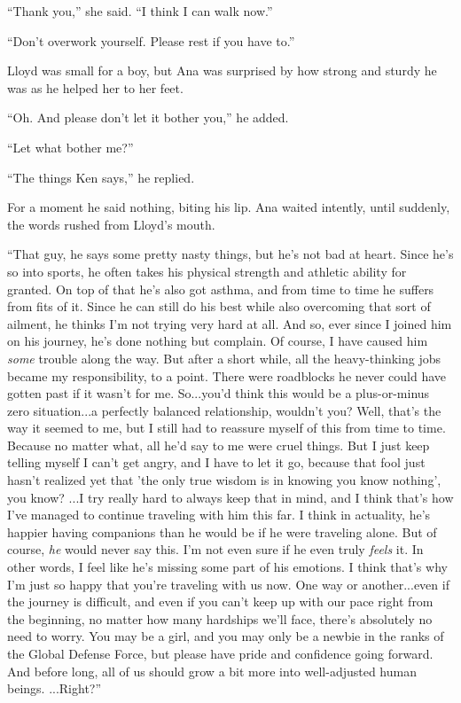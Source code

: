 \documentclass[
]{article}
\begin{document}
``Thank you,'' she said. ``I think I can walk now.''

``Don't overwork yourself. Please rest if you have to.''

Lloyd was small for a boy, but Ana was surprised by how strong and
sturdy he was as he helped her to her feet.

``Oh. And please don't let it bother you,'' he added.

``Let what bother me?''

``The things Ken says,'' he replied.

For a moment he said nothing, biting his lip. Ana waited intently, until
suddenly, the words rushed from Lloyd's mouth.

``That guy, he says some pretty nasty things, but he's not bad at heart.
Since he's so into sports, he often takes his physical strength and
athletic ability for granted. On top of that he's also got asthma, and
from time to time he suffers from fits of it. Since he can still do his
best while also overcoming that sort of ailment, he thinks I'm not
trying very hard at all. And so, ever since I joined him on his journey,
he's done nothing but complain. Of course, I have caused him \emph{some}
trouble along the way. But after a short while, all the heavy-thinking
jobs became my responsibility, to a point. There were roadblocks he
never could have gotten past if it wasn't for me. So...you'd think this
would be a plus-or-minus zero situation...a perfectly balanced
relationship, wouldn't you? Well, that's the way it seemed to me, but I
still had to reassure myself of this from time to time. Because no
matter what, all he'd say to me were cruel things. But I just keep
telling myself I can't get angry, and I have to let it go, because that
fool just hasn't realized yet that 'the only true wisdom is in knowing
you know nothing', you know? ...I try really hard to always keep that in
mind, and I think that's how I've managed to continue traveling with him
this far. I think in actuality, he's happier having companions than he
would be if he were traveling alone. But of course, \emph{he} would
never say this. I'm not even sure if he even truly \emph{feels} it. In
other words, I feel like he's missing some part of his emotions. I think
that's why I'm just so happy that you're traveling with us now. One way
or another...even if the journey is difficult, and even if you can't
keep up with our pace right from the beginning, no matter how many
hardships we'll face, there's absolutely no need to worry. You may be a
girl, and you may only be a newbie in the ranks of the Global Defense
Force, but please have pride and confidence going forward. And before
long, all of us should grow a bit more into well-adjusted human beings.
...Right?''
\end{document}
